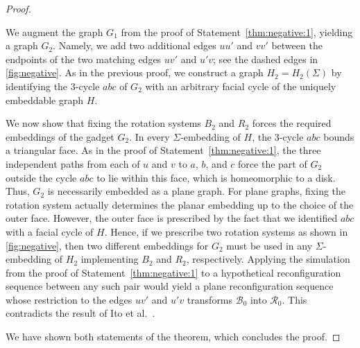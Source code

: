 \documentclass[a4paper,USenglish,cleveref,colorlinks=true,urlcolor=black,linkcolor=black,citecolor=black,thm-restate,authorcolumns]{lipics-v2021}
\theoremstyle{claimstyle}
\begin{document}
\begin{proof}
    \begin{claimproof}
        We augment the graph $G_1$ from the proof of Statement~\ref{thm:negative:1}, yielding a graph $G_2$.
        Namely, we add two additional edges $uu'$ and $vv'$ between the endpoints of the two matching edges $uv'$ and $u'v$; see the dashed edges in \cref{fig:negative}.
        As in the previous proof, we construct a graph $ H_2 = H_2(\Sigma)$ by identifying the $3$-cycle $abc$ of $G_2$ with an arbitrary facial cycle of the uniquely embeddable graph $H$.


        We now show that fixing the rotation systems $B_2$ and $R_2$ forces the required embeddings of the gadget $G_2$.
        In every $\Sigma$-embedding of $H$, the $3$-cycle $abc$ bounds a triangular face.
        As in the proof of Statement~\ref{thm:negative:1}, the three independent paths from each of $u$ and $v$ to $a$, $b$, and $c$ force the part of $G_2$ outside the cycle $abc$ to lie within this face, which is homeomorphic to a disk.
        Thus, $G_2$ is necessarily embedded as a plane graph.
        For plane graphs, fixing the rotation system actually determines the planar embedding up to the choice of the outer face.
        However, the outer face is prescribed by the fact that we identified $abc$ with a facial cycle of $H$.
        Hence, if we prescribe two rotation systems as shown in \cref{fig:negative}, then two different embeddings for $G_2$ must be used in any $\Sigma$-embedding of $H_2$ implementing $B_2$ and $R_2$, respectively.
        Applying the simulation from the proof of Statement~\ref{thm:negative:1} to a hypothetical reconfiguration sequence between any such pair would yield a plane reconfiguration sequence whose restriction to the edges $uv'$ and $u'v$ transforms $\mathcal B_0$ into $\mathcal R_0$.
        This contradicts the result of Ito et al.~\cite{ItoIK0MNOO25}.
    \end{claimproof}
    We have shown both statements of the theorem, which concludes the proof.
\end{proof}
\end{document}
